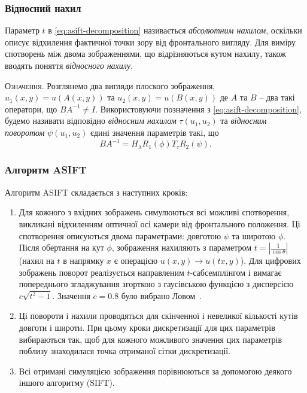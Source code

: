 \subsubsection{Відносний нахил}

Параметр $t$ в \ref{eq:asift-decomposition} називається \textit{абсолютним нахилом}, оскільки описує відхилення фактичної точки зору від фронтального вигляду. Для виміру спотворень між двома зображеннями, що відрізняються кутом нахилу, також вводять поняття \textit{відносного нахилу}.

\textsc{Означення}. Розглянемо два вигляди плоского зображення, $u_1(x,y) = u(A(x,y))$ та $u_2(x,y)=u(B(x,y))$ де $A$ та $B$ -- два такі оператори, що $BA^{-1} \ne I$. Використовуючи позначення з \ref{eq:asift-decomposition}, будемо називати відповідно \textit{відносним нахилом} $\tau(u_1,u_2)$ та \textit{відносним поворотом} $\psi(u_1,u_2)$ єдині значення параметрів такі, що 
\[
  BA^{-1} = H_\lambda R_1(\phi)T_\tau R_2(\psi).
\]

\subsubsection{Алгоритм ASIFT}
\label{sec:algo-asift}
Алгоритм ASIFT складається з наступних кроків:

\begin{enumerate}
    \item Для кожного з вхідних зображень симулюються всі можливі спотворення, викликані відхиленням оптичної осі камери від фронтального положення. Ці спотворення описуються двома параметрами: довготою $\psi$ та широтою $\phi$. Після обертання на кут $\phi$, зображення нахиляють з параметром $t = \left| \frac{1}{\cos\theta}\right|$ (нахил на $t$ в напрямку $x$ є операцією $u(x,y) \rightarrow u(tx,y)$). Для цифрових зображень поворот реалізується направленим $t$-сабсемплінгом і вимагає попереднього згладжування згорткою з гаусівською функцією з дисперсією $c\sqrt{t^2-1}$. Значення $c=0.8$ було вибрано Ловом~\cite{Lowe2004}.
    \item Ці повороти і нахили проводяться для скінченної і невеликої кількості кутів довготи і широти. При цьому кроки дискретизації для цих параметрів вибираються так, щоб для кожного можливого значення цих параметрів поблизу знаходилася точка отриманої сітки дискретизації.
    \item Всі отримані симуляцією зображення порівнюються за допомогою деякого іншого алгоритму (SIFT).
\end{enumerate}

